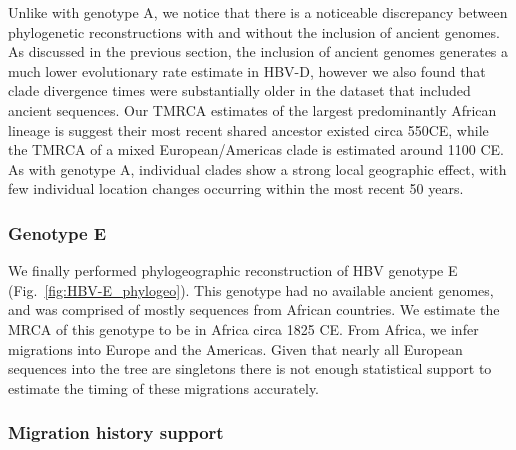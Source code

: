 Unlike with genotype A, we notice that there is a noticeable discrepancy between phylogenetic reconstructions with and without the inclusion of ancient genomes.
As discussed in the previous section, the inclusion of ancient genomes generates a much lower evolutionary rate estimate in HBV-D, however we also found that clade divergence times were substantially older in the dataset that included ancient sequences.
Our TMRCA estimates of the largest predominantly African lineage is suggest their most recent shared ancestor existed circa 550CE, while the TMRCA of a mixed European/Americas clade is estimated around 1100 CE.
As with genotype A, individual clades show a strong local geographic effect, with few individual location changes occurring within the most recent 50 years.

\subsubsection{Genotype E}

We finally performed phylogeographic reconstruction of HBV genotype E (Fig.~\ref{fig:HBV-E_phylogeo}).
This genotype had no available ancient genomes, and was comprised of mostly sequences from African countries.
We estimate the MRCA of this genotype to be in Africa circa 1825 CE.
From Africa, we infer migrations into Europe and the Americas.
Given that nearly all European sequences into the tree are singletons there is not enough statistical support to estimate the timing of these migrations accurately.

\subsubsection{Migration history support}

